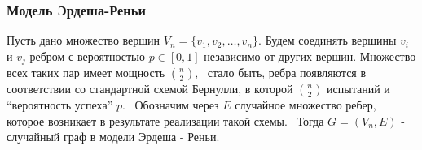 \frametitle{Модель Эрдеша-Реньи} 


\begin{rdefinition}    
    Пусть дано множество вершин $V_n = \{v_1, v_2, \dots, v_n\}$. 
    Будем соединять вершины $v_i$ и $v_j$ ребром с вероятностью $p \in [0, 1]$ независимо от других вершин.  
    Множество всех таких пар имеет мощность $\binom{n}{2}$, \
    стало быть, ребра появляются в соответствии со стандартной схемой Бернулли, в которой  $\binom{n}{2}$ испытаний и “вероятность успеха” $p$. \
    Обозначим через $E$ случайное множество ребер, которое возникает в результате реализации такой схемы. \
    Тогда $G = (V_n, E)$ - случайный граф в модели Эрдеша - Реньи.
\end{rdefinition}